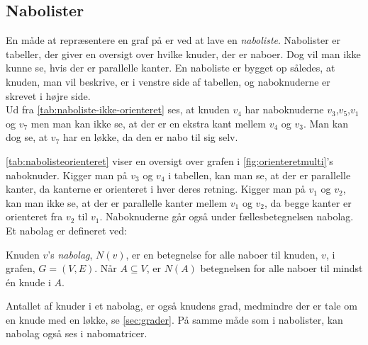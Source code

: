 \subsection{Nabolister}
En måde at repræsentere en graf på er ved at lave en \emph{naboliste}. Nabolister er tabeller, der giver en oversigt over hvilke knuder, der er naboer. Dog vil man ikke kunne se, hvis der er parallelle kanter. En naboliste er bygget op således, at knuden, man vil beskrive, er i venstre side af tabellen, og naboknuderne er skrevet i højre side. \\




Ud fra \autoref{tab:naboliste-ikke-orienteret} ses, at knuden $v_4$ har naboknuderne $v_3$,$v_5$,$v_1$ og $v_7$ men man kan ikke se, at der er en ekstra kant mellem $v_4$ og $v_3$. Man kan dog se, at $v_7$ har en løkke, da den er nabo til sig selv.


\autoref{tab:nabolisteorienteret} viser en oversigt over grafen i \autoref{fig:orienteretmulti}'s naboknuder. Kigger man på $v_3$ og $v_4$ i tabellen, kan man se, at der er parallelle kanter, da kanterne er orienteret i hver deres retning. Kigger man på $v_1$ og $v_2$, kan man ikke se, at der er parallelle kanter mellem $v_1$ og $v_2$, da begge kanter er orienteret fra $v_2$ til $v_1$. Naboknuderne går også under fællesbetegnelsen nabolag. Et nabolag er defineret ved:

\begin{defn}[Nabolag] \label{defn:nabolag}
Knuden $v$'s \emph{nabolag}, $N(v)$, er en betegnelse for alle naboer til knuden, $v$, i grafen, $G=(V,E)$. Når $A \subseteq V$, er $N(A)$ betegnelsen for alle naboer til mindst én knude i $A$.
\end{defn}

Antallet af knuder i et nabolag, er også knudens grad, medmindre der er tale om en knude med en løkke, se \autoref{sec:grader}. 
På samme måde som i nabolister, kan nabolag også ses i nabomatricer.